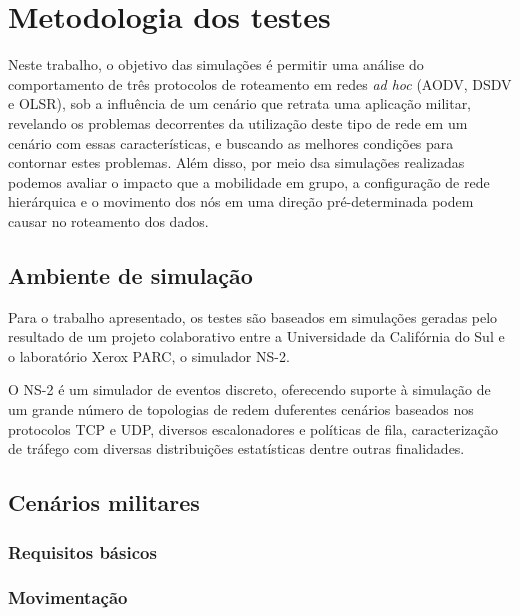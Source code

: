 \section{Metodologia dos testes} 
Neste trabalho, o objetivo das simula\c{c}\~oes \'e permitir uma an\'alise do comportamento de tr\^es protocolos de roteamento em redes \textit{ad hoc} (AODV, DSDV e OLSR), sob a influ\^encia de um cen\'ario que retrata uma aplica\c{c}\~ao militar, revelando os problemas decorrentes da utiliza\c{c}\~ao deste tipo de rede em um cen\'ario com essas caracter\'isticas, e buscando as melhores condi\c{c}\~oes para contornar estes problemas. Al\'em disso, por meio dsa simula\c{c}\~oes realizadas podemos avaliar o impacto que a mobilidade em grupo, a configura\c{c}\~ao de rede hier\'arquica e o movimento dos n\'os em uma dire\c{c}\~ao pr\'e-determinada podem causar no roteamento dos dados.

\subsection{Ambiente de simula\c{c}\~ ao}
Para o trabalho apresentado, os testes s\~ao baseados em simula\c{c}\~oes geradas pelo resultado de um projeto colaborativo entre a Universidade da Calif\'ornia do Sul e o laborat\'orio Xerox PARC, o simulador NS-2.

O NS-2 \'e um simulador de eventos discreto, oferecendo suporte \`a simula\c{c}\~ao de um grande n\'umero de topologias de redem duferentes cen\'arios baseados nos protocolos TCP e UDP, diversos escalonadores e pol\'iticas de fila, caracteriza\c{c}\~ao de tr\'afego com diversas distribui\c{c}\~oes estat\'isticas dentre outras finalidades.

\subsection{Cen\'arios militares}
\subsubsection{Requisitos b\'asicos}
\subsubsection{Movimenta\c{c}\~ao}



